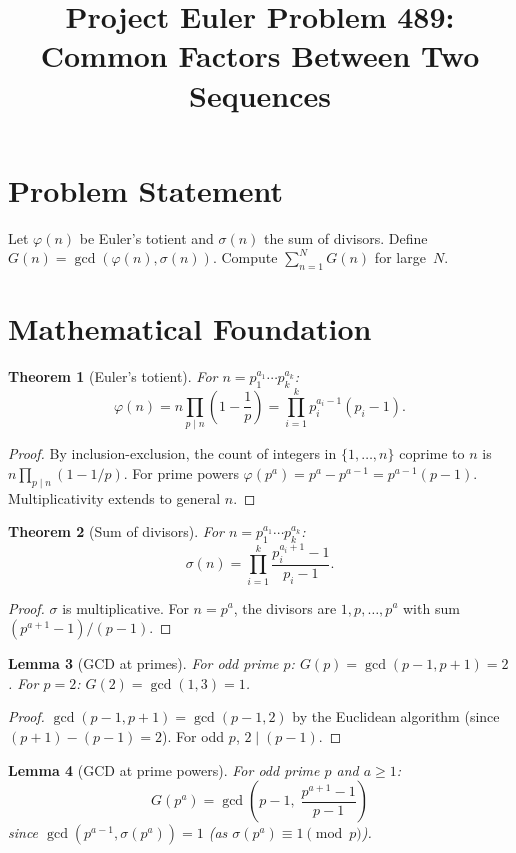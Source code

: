 \documentclass[12pt]{article}
\title{Project Euler Problem 489: Common Factors Between Two Sequences}
\author{}
\date{}
\newtheorem{theorem}{Theorem}
\newtheorem{lemma}[theorem]{Lemma}
\begin{document}
\maketitle

\section{Problem Statement}
Let $\varphi(n)$ be Euler's totient and $\sigma(n)$ the sum of divisors. Define $G(n)=\gcd(\varphi(n),\sigma(n))$. Compute $\sum_{n=1}^N G(n)$ for large~$N$.

\section{Mathematical Foundation}

\begin{theorem}[Euler's totient]
For $n = p_1^{a_1}\cdots p_k^{a_k}$:
\[
\varphi(n) = n\prod_{p\mid n}\!\left(1-\frac{1}{p}\right) = \prod_{i=1}^k p_i^{a_i-1}(p_i-1).
\]
\end{theorem}

\begin{proof}
By inclusion-exclusion, the count of integers in $\{1,\ldots,n\}$ coprime to $n$ is $n\prod_{p\mid n}(1-1/p)$. For prime powers $\varphi(p^a) = p^a - p^{a-1} = p^{a-1}(p-1)$. Multiplicativity extends to general $n$.
\end{proof}

\begin{theorem}[Sum of divisors]
For $n = p_1^{a_1}\cdots p_k^{a_k}$:
\[
\sigma(n) = \prod_{i=1}^k\frac{p_i^{a_i+1}-1}{p_i-1}.
\]
\end{theorem}

\begin{proof}
$\sigma$ is multiplicative. For $n=p^a$, the divisors are $1,p,\ldots,p^a$ with sum $(p^{a+1}-1)/(p-1)$.
\end{proof}

\begin{lemma}[GCD at primes]
For odd prime $p$: $G(p)=\gcd(p-1,p+1)=2$. For $p=2$: $G(2)=\gcd(1,3)=1$.
\end{lemma}

\begin{proof}
$\gcd(p-1,p+1) = \gcd(p-1,2)$ by the Euclidean algorithm (since $(p+1)-(p-1)=2$). For odd $p$, $2\mid(p-1)$.
\end{proof}

\begin{lemma}[GCD at prime powers]
For odd prime $p$ and $a\ge 1$:
\[
G(p^a) = \gcd\!\left(p-1,\;\frac{p^{a+1}-1}{p-1}\right)
\]
since $\gcd(p^{a-1},\sigma(p^a))=1$ (as $\sigma(p^a)\equiv 1\pmod{p}$).
\end{lemma}
\end{document}

